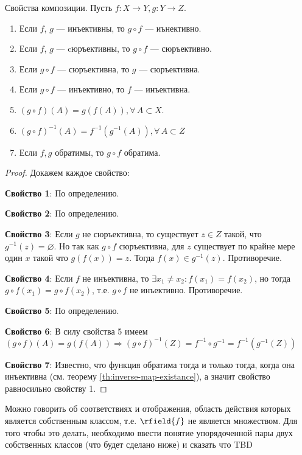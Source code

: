 \documentclass{article}
\begin{document}
\begin{proposition}
    \label{prop:comp-properties}
    Свойства композиции. Пусть \(f: X \rightarrow Y, g: Y \rightarrow Z\).
    \begin{enumerate}
        \item Если \(f\), \(g\) --- инъективны, то \(g \circ f\) --- иънективно.
        \item Если \(f\), \(g\) --- cюръективны, то \(g \circ f\) --- сюръективно.
        \item Если \(g \circ f\) --- сюръективна, то \(g\) --- сюръективна.
        \item Если \(g \circ f\) --- инъективно, то \(f\) --- инъективна.
        \item \((g \circ f) (A) = g(f(A)), \forall\, A \subset X\).
        \item \((g \circ f)^{-1}(A) = f^{-1}(g^{-1}(A)), \forall\, A \subset Z\)
        \item Если \(f, g\) обратимы, то \(g \circ f\) обратима. 
    \end{enumerate}
\end{proposition}
\begin{proof} Докажем каждое свойство: 

    \textbf{Свойство 1}: По определению. 
    
    \textbf{Свойство 2}: По определению. 
    
    \textbf{Свойство 3}: Если \(g\) не сюръективна, то существует \(z \in Z\) такой, что \(g^{-1}(z) = \varnothing\). Но так как \(g \circ f\) сюръективна, для \(z\) существует по крайне мере один \(x\) такой что \(g(f(x)) = z\). Тогда \(f(x) \in g^{-1}(z)\). Противоречие.
    
    \textbf{Свойство 4}: Если \(f\) не инъективна, то \(\exists x_1 \ne x_2: f(x_1) = f(x_2)\), но тогда \(g \circ f (x_1) = g \circ f (x_2)\), т.е. \(g \circ f\) не инъективно. Противоречие. 
    
    \textbf{Свойство 5}: По определению. 
    
    \textbf{Свойство 6}: В силу свойства 5 имеем \((g \circ f)(A) = g(f(A)) \Rightarrow (g \circ f)^{-1}(Z) = f^{-1} \circ g^{-1} = f^{-1}\left(g^{-1}(Z)\right)\)
    
    \textbf{Свойство 7}: Известно, что функция обратима тогда и только тогда, когда она инъективна (см. теорему \ref{th:inverse-map-existance}), а значит свойство равносильно свойству 1.
\end{proof}


\begin{remark*}
    Можно говорить об соответствиях и отображения, область действия которых является собственным классом, т.е. $\rfield{f}$ не является множеством. Для того чтобы это делать, необходимо ввести понятие упорядоченной пары двух собственных классов (что будет сделано ниже) и сказать что TBD 
\end{remark*}
\end{document}
